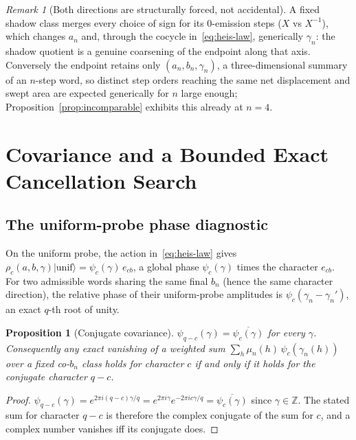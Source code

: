 \documentclass[11pt,a4paper]{article}
\newtheorem{proposition}[theorem]{Proposition}
\theoremstyle{definition}
\theoremstyle{remark}
\newtheorem{remark}[theorem]{Remark}
\newcommand{\Z}{\mathbb{Z}}
\begin{document}
\begin{remark}[Both directions are structurally forced, not accidental]
  \label{rem:incomparable-why}
  A fixed shadow class merges every choice of sign for its $0$-emission steps ($X$ vs
  $X^{-1}$), which changes $a_n$ and, through the cocycle in~\eqref{eq:heis-law},
  generically $\gamma_n$: the shadow quotient is a genuine coarsening of the endpoint
  along that axis. Conversely the endpoint retains only $(a_n,b_n,\gamma_n)$, a
  three-dimensional summary of an $n$-step word, so distinct step orders reaching the
  same net displacement and swept area are expected generically for $n$ large enough;
  Proposition~\ref{prop:incomparable} exhibits this already at $n=4$.
\end{remark}

\section{Covariance and a Bounded Exact Cancellation Search}
\label{sec:search}

\subsection{The uniform-probe phase diagnostic}

On the uniform probe, the action in~\eqref{eq:heis-law} gives
$\rho_c(a,b,\gamma)|\mathrm{unif}\rangle = \psi_c(\gamma)\,e_{cb}$, a global phase
$\psi_c(\gamma)$ times the character $e_{cb}$. For two admissible words sharing the
same final $b_n$ (hence the same character direction), the relative phase of their
uniform-probe amplitudes is $\psi_c(\gamma_n-\gamma_n')$, an exact $q$-th root of
unity.

\begin{proposition}[Conjugate covariance]
  \label{prop:conjugate}
  $\psi_{q-c}(\gamma) = \overline{\psi_c(\gamma)}$ for every $\gamma$. Consequently any
  exact vanishing of a weighted sum $\sum_h \mu_n(h)\,\psi_c(\gamma_n(h))$ over a fixed
  co-$b_n$ class holds for character $c$ if and only if it holds for the conjugate
  character $q-c$.
\end{proposition}

\begin{proof}
  $\psi_{q-c}(\gamma)=e^{2\pi i (q-c)\gamma/q}=e^{2\pi i\gamma}e^{-2\pi ic\gamma/q}
  =\overline{\psi_c(\gamma)}$ since $\gamma\in\Z$. The stated sum for character $q-c$ is
  therefore the complex conjugate of the sum for $c$, and a complex number vanishes iff
  its conjugate does.
\end{proof}
\end{document}
